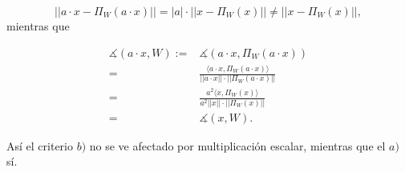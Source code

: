 \[
|| a \cdot x - \Pi_{W}(a \cdot x) || = |a| \cdot || x - \Pi_{W}(x) ||
\neq || x - \Pi_{W}(x) ||, 
\]
mientras que

\begin{align*}
\measuredangle (a \cdot x, W):=& \measuredangle(a \cdot x, \Pi_{W}(a \cdot x)) \\
= & \frac{\langle a \cdot x , \Pi_{W}(a \cdot x) \rangle}{|| a \cdot x || \cdot 
|| \Pi_{W}(a \cdot x)  ||} \\
= & \frac{a^{2}  \langle   x , \Pi_{W}(x) \rangle}{a^{2} ||  x || \cdot 
|| \Pi_{W}( x)  ||}  \\
= & \measuredangle (x, W).
\end{align*}


\QEDB
\vspace{0.2cm}

Así el criterio $b)$ no se ve afectado por multiplicación escalar,
mientras que el $a)$ sí.
 


